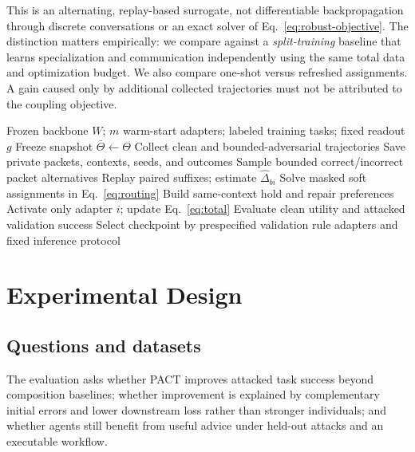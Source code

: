 \documentclass[10pt,twocolumn]{article}
\newcommand{\method}{\textsc{PACT}}
\begin{document}
This is an alternating, replay-based surrogate, not differentiable backpropagation through discrete conversations or an exact solver of Eq.~\eqref{eq:robust-objective}. The distinction matters empirically: we compare against a \emph{split-training} baseline that learns specialization and communication independently using the same total data and optimization budget. We also compare one-shot versus refreshed assignments. A gain caused only by additional collected trajectories must not be attributed to the coupling objective.

\begin{algorithm}[t]
\caption{\method{} with sequential adapter updates}
\label{alg:pact}
\begin{algorithmic}[1]
\Require Frozen backbone $W$; $m$ warm-start adapters; labeled training tasks; fixed readout $g$
 \State Freeze snapshot $\bar\Theta\leftarrow\Theta$
 \State Collect clean and bounded-adversarial trajectories
 \State Save private packets, contexts, seeds, and outcomes
  \State Sample bounded correct/incorrect packet alternatives
  \State Replay paired suffixes; estimate $\widehat\Delta_{bi}$
 \EndFor
 \State Solve masked soft assignments in Eq.~\eqref{eq:routing}
 \State Build same-context hold and repair preferences
  \State Activate only adapter $i$; update Eq.~\eqref{eq:total}
 \EndFor
 \State Evaluate clean utility and attacked validation success
\EndFor
\State Select checkpoint by prespecified validation rule
\State \Return adapters and fixed inference protocol
\end{algorithmic}
\end{algorithm}

\section{Experimental Design}
\label{sec:experiments}
\subsection{Questions and datasets}
The evaluation asks whether \method{} improves attacked task success beyond composition baselines; whether improvement is explained by complementary initial errors and lower downstream loss rather than stronger individuals; and whether agents still benefit from useful advice under held-out attacks and an executable workflow.
\end{document}
